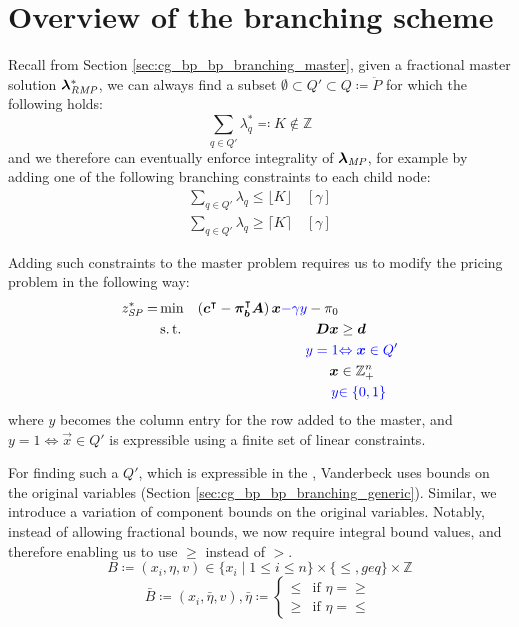 \section{Overview of the branching scheme}\label{sec:cmpbnd_overview}
Recall from Section \ref{sec:cg_bp_bp_branching_master}, given a fractional master solution ${\bm{\lambda}}^*_{\textit{RMP}}{}$, we can always find a subset $\emptyset \subset Q' \subset Q \coloneqq \ddot{P}$ for which the following holds:
\begin{equation}
\sum_{q \in Q'} \lambda_q^* \eqqcolon K \not\in \mathbb{Z}
\end{equation}
and we therefore can eventually enforce integrality of ${\bm{\lambda}}_{\textit{MP}}{}$, for example by adding one of the following branching constraints to each child node:
\begin{equation}
\begin{aligned}
\sum_{q \in Q'} \lambda_q \leq \lfloor K \rfloor \quad \left[\gamma\right] \\
\sum_{q \in Q'} \lambda_q \geq \lceil K \rceil \quad \left[\gamma\right]
\end{aligned}
\end{equation}

Adding such constraints to the master problem requires us to modify the pricing problem in the following way:
\begin{equation}
\begin{aligned}
z^*_\SP{} = &\min & \left( \vec{c}\transpose - \vec{\pi}_\vec{b}\transpose \mat{A} \right) \vec{x} {\color{blue} - \gamma y} - \pi_0 & \\
&\st & \mat{D} \vec{x} & \geq \vec{d} \\
&& {\color{blue} y = 1} & {\color{blue} \Leftrightarrow \vec{x} \in Q'} \\
&& \vec{x} & \in \mathbb{Z}_+^n \\
&& {\color{blue} y} & {\color{blue} \in \{0, 1\}}
\end{aligned}
\end{equation}
where $y$ becomes the column entry for the row added to the master, and $y = 1 \Leftrightarrow \vec{x} \in Q'$ is expressible using a finite set of linear constraints.

For finding such a $Q'$, which is expressible in the \SP{}, Vanderbeck uses bounds on the original variables (Section \ref{sec:cg_bp_bp_branching_generic}). Similar, we introduce a variation of component bounds on the original variables. Notably, instead of allowing fractional bounds, we now require integral bound values, and therefore enabling us to use $\geq$ instead of $>$.
\begin{equation}
B \coloneqq \left( x_i, \eta, v \right) \in \{x_i \mid 1 \leq i \leq n\} \times \{\leq, geq\} \times \mathbb{Z}
\end{equation}
\begin{equation}
\bar{B} \coloneqq \left( x_i, \bar{\eta}, v \right), \bar{\eta} \coloneqq \begin{cases} \leq & \text{if } \eta = \geq \\ \geq & \text{if } \eta = \leq \end{cases}
\end{equation}

